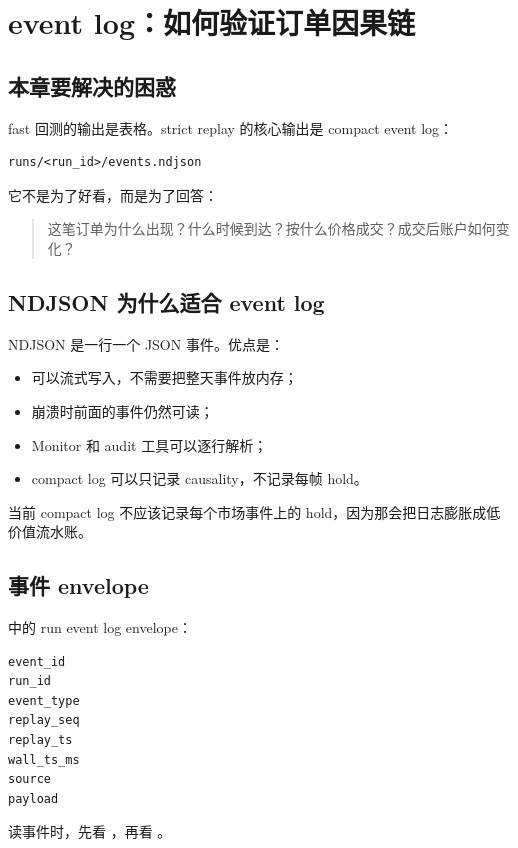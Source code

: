 \chapter{event log：如何验证订单因果链}

\section{本章要解决的困惑}

fast 回测的输出是表格。strict replay 的核心输出是 compact event log：

\begin{lstlisting}
runs/<run_id>/events.ndjson
\end{lstlisting}

它不是为了好看，而是为了回答：

\begin{quote}
这笔订单为什么出现？什么时候到达？按什么价格成交？成交后账户如何变化？
\end{quote}

\section{NDJSON 为什么适合 event log}

NDJSON 是一行一个 JSON 事件。优点是：

\begin{itemize}[leftmargin=2em]
  \item 可以流式写入，不需要把整天事件放内存；
  \item 崩溃时前面的事件仍然可读；
  \item Monitor 和 audit 工具可以逐行解析；
  \item compact log 可以只记录 causality，不记录每帧 hold。
\end{itemize}

当前 compact log 不应该记录每个市场事件上的 hold，因为那会把日志膨胀成低价值流水账。

\section{事件 envelope}

 中的 run event log envelope：

\begin{lstlisting}
event_id
run_id
event_type
replay_seq
replay_ts
wall_ts_ms
source
payload
\end{lstlisting}

读事件时，先看 ，再看 。


